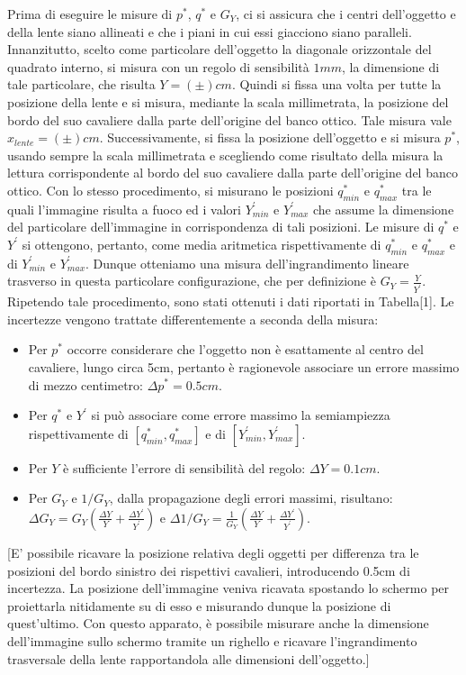 \documentclass{article}
\begin{document}
Prima di eseguire le misure di $p^*$, $q^*$ e $G_Y$, ci si assicura che i centri dell'oggetto e della lente siano allineati e che i piani in cui essi giacciono siano paralleli. Innanzitutto, scelto come particolare dell'oggetto la diagonale orizzontale del quadrato interno, si misura con un regolo di sensibilità $1mm$, la dimensione di tale particolare, che risulta $Y=(\pm)cm$. Quindi si fissa una volta per tutte la posizione della lente e si misura, mediante la scala millimetrata, la posizione del bordo del suo cavaliere dalla parte dell'origine del banco ottico. Tale misura vale $x_{lente}=(\pm)cm$. Successivamente, si fissa la posizione dell'oggetto e si misura $p^*$, usando sempre la scala millimetrata e scegliendo come risultato della misura la lettura corrispondente al bordo del suo cavaliere dalla parte dell'origine del banco ottico. Con lo stesso procedimento, si misurano le posizioni $q^*_{min}$ e $q^*_{max}$ tra le quali l'immagine risulta a fuoco ed i valori $Y^'_{min}$ e $Y^'_{max}$ che assume la dimensione del particolare dell'immagine in corrispondenza di tali posizioni. Le misure di $q^*$ e $Y^'$ si ottengono, pertanto, come media aritmetica rispettivamente di $q^*_{min}$ e $q^*_{max}$ e di $Y^'_{min}$ e $Y^'_{max}$. Dunque otteniamo una misura dell'ingrandimento lineare trasverso in questa particolare configurazione, che per definizione è $G_Y = \frac{Y}{Y^'}$. Ripetendo tale procedimento, sono stati ottenuti i dati riportati in Tabella[1]. Le incertezze vengono trattate differentemente a seconda della misura:
\begin{itemize}
\item Per $p^*$ occorre considerare che l'oggetto non è esattamente al centro del cavaliere, lungo circa 5cm, pertanto è ragionevole associare un errore massimo di mezzo centimetro: $\Delta p^* = 0.5 cm$.
\item Per $q^*$ e $Y^'$ si può associare come errore massimo la semiampiezza rispettivamente di $[q^*_{min},q^*_{max}]$ e di $[Y^'_{min},Y^'_{max}]$.
\item Per $Y$ è sufficiente l'errore di sensibilità del regolo: $\Delta Y = 0.1 cm$.
\item Per $G_Y$ e $1/G_Y$, dalla propagazione degli errori massimi, risultano: $\Delta G_Y = G_Y (\frac{\Delta Y}{Y}+\frac{\Delta Y^'}{Y^'})$ e
$\Delta 1/G_Y = \frac{1}{G_Y} (\frac{\Delta Y}{Y}+\frac{\Delta Y^'}{Y^'})$.
\end{itemize}

[E' possibile ricavare la posizione relativa degli oggetti per differenza tra le posizioni del bordo sinistro dei rispettivi cavalieri, introducendo 0.5cm di incertezza. La posizione dell'immagine veniva ricavata spostando lo schermo per proiettarla nitidamente su di esso e misurando dunque la posizione di quest'ultimo. Con questo apparato, è possibile misurare anche la dimensione dell'immagine sullo schermo tramite un righello e ricavare l'ingrandimento trasversale della lente rapportandola alle dimensioni dell'oggetto.]
\end{document}
